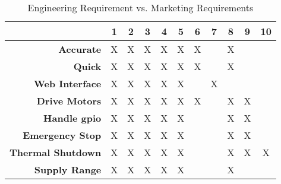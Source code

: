 \begin{table}[ht]
	\caption{Engineering Requirement vs. Marketing Requirements}
	\label{table:Val}
	\centering
	\begin{tabular}{|r |c |c |c |c |c |c |c |c |c |c|} 
		\hline\hline
		&1&2&3&4&5&6&7&8&9&10 \\
		\hline
		\textbf{Accurate} & X & X & X & X & X & X & & X & & \\
		\hline
		\textbf{Quick} & X & X & X & X & X & X & & X & & \\
		\hline
		\textbf{Web Interface} & X & X & X & X & X & & X & & & \\
		\hline
		\textbf{Drive Motors} & X & X & X & X & X & X & & X & X & \\
		\hline
		\textbf{Handle \gls{gpio}} & X & X & X & X & X & & & X & X & \\
		\hline
		\textbf{Emergency Stop} & X & X & X & X & X & & & X & X & \\
		\hline
		\textbf{Thermal Shutdown} & X & X & X & X & X & & & X & X & X \\
		\hline
		\textbf{Supply Range} & X & X & X & X & X & & & X &  &   \\

	\hline 
	\end{tabular}
\end{table}